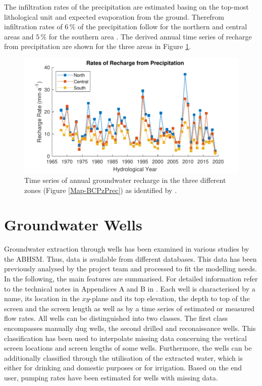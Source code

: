The infiltration rates of the precipitation are estimated basing on the top-most lithological unit and expected evaporation from the ground. Therefrom infiltration rates of $6 \, \%$ of the precipitation follow for the northern and central areas and $5 \, \%$ for the southern area \parencite{Resing.2008}. The derived annual time series of recharge from precipitation are shown for the three areas in Figure \ref{Fig-RechPrec}.

\begin{figure}[h]
    \centering
    \includegraphics{./img/Fig-PrecRecharge.pdf}
    \caption{Time series of annual groundwater recharge in the three different zones (Figure \ref{Map-BCPzPrec}) as identified by \cite{Horn.2021}.}
    \label{Fig-RechPrec}
\end{figure}


\section{Groundwater Wells}
\label{Sec-GWWells}

Groundwater extraction through wells has been examined in various studies by the ABHSM. Thus, data is available from different databases. This data has been previously analysed by the project team and processed to fit the modelling needs. In the following, the main features are summarised. For detailed information refer to the technical notes in Appendices A and B in \cite{Horn.2021}. Each well is characterised by a name, its location in the $xy$-plane and its top elevation, the depth to top of the screen and the screen length as well as by a time series of estimated or measured flow rates. All wells can be distinguished into two classes. The first class encompasses manually dug wells, the second drilled and reconaissance wells. This classification has been used to interpolate missing data concerning the vertical screen locations and screen lengths of some wells. Furthermore, the wells can be additionally classified through the utilisation of the extracted water, which is either for drinking and domestic purposes or for irrigation. Based on the end user, pumping rates have been estimated for wells with missing data.

